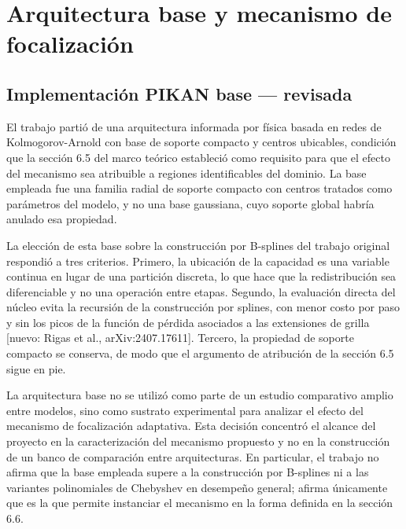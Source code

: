 \section{Arquitectura base y mecanismo de focalización}
\label{subsec:arquitectura-base-mecanismo}

\subsection{Implementación PIKAN base — revisada}

El trabajo partió de una arquitectura informada por física basada en redes de Kolmogorov-Arnold \cite{toscano2025pikans,shukla2024fair,wang2025kinn} con base de soporte compacto y centros ubicables, condición que la sección 6.5 del marco teórico estableció como requisito para que el efecto del mecanismo sea atribuible a regiones identificables del dominio. La base empleada fue una familia radial de soporte compacto con centros tratados como parámetros del modelo, y no una base gaussiana, cuyo soporte global habría anulado esa propiedad.

La elección de esta base sobre la construcción por B-splines del trabajo original \cite{liu2024kan} respondió a tres criterios. Primero, la ubicación de la capacidad es una variable continua en lugar de una partición discreta, lo que hace que la redistribución sea diferenciable y no una operación entre etapas. Segundo, la evaluación directa del núcleo evita la recursión de la construcción por splines, con menor costo por paso y sin los picos de la función de pérdida asociados a las extensiones de grilla [nuevo: Rigas et al., arXiv:2407.17611]. Tercero, la propiedad de soporte compacto se conserva, de modo que el argumento de atribución de la sección 6.5 sigue en pie.

La arquitectura base no se utilizó como parte de un estudio comparativo amplio entre modelos, sino como sustrato experimental para analizar el efecto del mecanismo de focalización adaptativa. Esta decisión concentró el alcance del proyecto en la caracterización del mecanismo propuesto y no en la construcción de un banco de comparación entre arquitecturas. En particular, el trabajo no afirma que la base empleada supere a la construcción por B-splines ni a las variantes polinomiales de Chebyshev en desempeño general; afirma únicamente que es la que permite instanciar el mecanismo en la forma definida en la sección 6.6.


